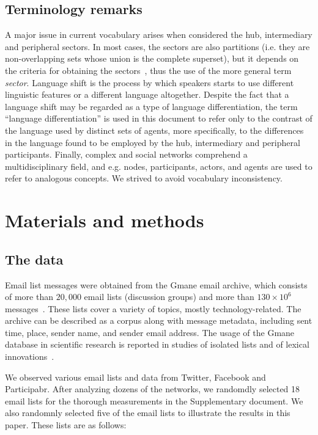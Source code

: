 \documentclass[review]{elsarticle}
\begin{document}
\subsection{Terminology remarks}
A major issue in current vocabulary arises when considered the hub, intermediary and peripheral sectors.
In most cases, the sectors are also partitions
(i.e. they are non-overlapping sets whose union is the complete superset),
but it depends on the criteria for obtaining the sectors~\cite{stab},
thus the use of the more general term \emph{sector}.
Language shift is the process by which speakers starts to use different linguistic features or a different language altogether.
Despite the fact that a language shift may be regarded as a type of language differentiation, the term ``language differentiation'' is used in this document
to refer only to the contrast of the language used by distinct sets of agents,
more specifically, to the differences in the language found to be employed by the hub, intermediary and peripheral participants.
Finally, complex and social networks comprehend a multidisciplinary field,
and e.g. nodes, participants, actors, and agents are used to refer to analogous concepts.
We strived to avoid vocabulary inconsistency.

\section{Materials and methods}\label{smm}
\subsection{The data}
Email list messages were obtained from
the Gmane email archive, which consists of more than $20,000$
email lists (discussion groups) and more than $130\times 10^6$ messages~\cite{GMANEwikipedia}. These lists cover a variety of topics, mostly technology-related. The archive can be described as a corpus along with message metadata, including sent time, place, sender name, and sender email address.
The usage of the Gmane database in scientific research is reported in studies of isolated lists and of lexical innovations~\cite{Gmane2,bird}. 

We observed various email lists and data from Twitter, Facebook and Participabr.
After analyzing dozens of the networks,
we randomdly selected 18 email lists for the thorough measurements in the
Supplementary document.
We also randomnly selected five of the email lists
to illustrate the results in this paper.
These lists are as follows:
\end{document}
